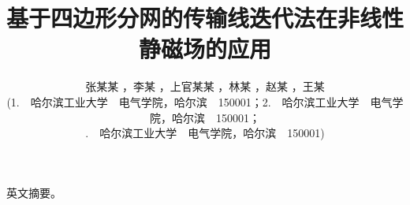 \documentclass[10.5pt,twocolumn]{jbuaa}
\begin{document}
\title{
\vspace{0cm} \erhao\hei 基于四边形分网的传输线迭代法在非线性静磁场的应用 %
}

\author{
\sihao\fang 张某某 ，李某 ，上官某某 ，林某 ，赵某 ，王某 \\[0.1cm]
\wuhao \kai (1.~~哈尔滨工业大学~~电气学院，哈尔滨~~150001；2.~~哈尔滨工业大学~~电气学院，哈尔滨~~150001；\\
\wuhao {}.~~哈尔滨工业大学~~电气学院，哈尔滨~~150001)
}

\date{}  %

  \maketitle
\begin{EAbstractJBUAA}
英文摘要。
\end{EAbstractJBUAA}
\end{document}

